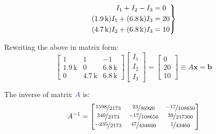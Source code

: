 \begin{equation*}
    \begin{rcases}
        \begin{aligned}[t]
            I_1 + I_2 - I_3 &= 0 \\
            \qty(1.9\,\text{k})I_1+\qty(6.8\,\text{k})I_3&=20 \\
            \qty(4.7\,\text{k})I_2+\qty(6.8\,\text{k})I_3&=10
        \end{aligned}
    \end{rcases}
\end{equation*}

Rewriting the above in matrix form:
\begin{equation*}
    \begin{bmatrix}
        1 & 1 & -1 \\
        1.9 \, \text{k} & 0 & 6.8 \, \text{k} \\
        0 & 4.7 \, \text{k} & 6.8 \, \text{k}
    \end{bmatrix}
    \begin{bmatrix}
        I_1 \\
        I_2 \\
        I_3
    \end{bmatrix}
        =
    \begin{bmatrix}
        0 \\
        20 \\
        10
    \end{bmatrix}
    \equiv A \mathbf{x} = \mathbf{b}
\end{equation*}

\newpage

The inverse of matrix $\mblue{A}$ is:
\begin{equation*}
    A^{-1}=
    \begin{bmatrix}
        \nicefrac{1598}{2173} & \nicefrac{23}{86920} & \nicefrac{-17}{108650} \\
        \nicefrac{340}{2173} & \nicefrac{-17}{108650} & \nicefrac{39}{217300} \\
        \nicefrac{-235}{2173} & \nicefrac{47}{434600} & \nicefrac{1}{43460}
    \end{bmatrix}
\end{equation*}

